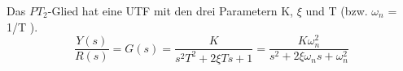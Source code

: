 Das $PT_2$-Glied hat eine UTF mit den drei Parametern K, $\xi$ und T (bzw. $\omega_n$ = 1/T ).
\begin{equation}
\boxed{\frac{Y(s)}{R(s)}=G(s)=\frac{K}{s^2T^2+2\xi Ts+1}=\frac{K\omega^{2}_{n}}{s^2 + 2\xi \omega_{n}s+\omega^{2}_{n}}}
\end{equation}
%
